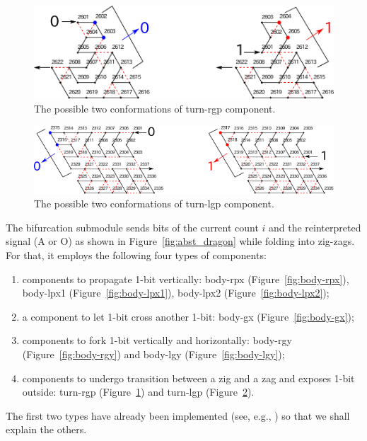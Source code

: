 \documentclass{article}
\theoremstyle{remark}
\begin{document}
\begin{figure}[h]
\centering
\includegraphics[width=0.7\linewidth]{turn-rgp.pdf}
\caption{The possible two conformations of turn-rgp component.}
\label{fig:turn-rgp}
\end{figure}

\begin{figure}[h]
\centering
\includegraphics[width=0.8\linewidth]{turn-lgp.pdf}
\caption{The possible two conformations of turn-lgp component.}
\label{fig:turn-lgp}
\end{figure}



The bifurcation submodule sends bits of the current count $i$ and the reinterpreted signal (A or O) as shown in Figure~\ref{fig:abst_dragon} while folding into zig-zags.
For that, it employs the following four types of components: 
\begin{enumerate}[itemsep=0pt]
\item components to propagate 1-bit vertically: body-rpx (Figure~\ref{fig:body-rpx}), body-lpx1 (Figure~\ref{fig:body-lpx1}), body-lpx2 (Figure~\ref{fig:body-lpx2}); 
\item a component to let 1-bit cross another 1-bit: body-gx (Figure~\ref{fig:body-gx}); 
\item components to fork 1-bit vertically and horizontally: body-rgy (Figure~\ref{fig:body-rgy}) and body-lgy (Figure~\ref{fig:body-lgy});  
\item components to undergo transition between a zig and a zag and exposes 1-bit outside: turn-rgp (Figure~\ref{fig:turn-rgp}) and turn-lgp (Figure~\ref{fig:turn-lgp}). 
\end{enumerate} 
The first two types have already been implemented (see, e.g., \cite{HaKiOtSe2016}) so that we shall explain the others.
\end{document}
